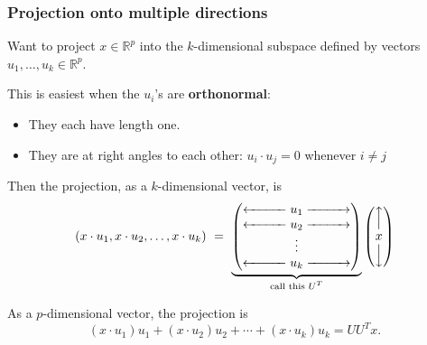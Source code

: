 \documentclass[smaller]{beamer}
\def\R{{\mathbb R}}
\def\darkred{\color{red!70!black}}
\def\darkgreen{\color{green!60!black}}
\def\vone{{\vskip.1in}}
\def\R{{\mathbb R}}
\begin{document}
\begin{frame}
\frametitle{Projection onto multiple directions}

{\darkred Want to project $x \in \R^p$ into the $k$-dimensional subspace defined by vectors $u_1, \ldots, u_k \in \R^p$.}

\pause\vone
This is easiest when the $u_i$'s are {\bf orthonormal}:
\begin{itemize}
\item They each have length one.
\item They are at right angles to each other: $u_i \cdot u_j = 0$ whenever $i \neq j$
\end{itemize}

\pause\vone
Then the projection, as a $k$-dimensional vector, is
$$ (x \cdot u_1, x \cdot u_2, \ldots, x \cdot u_k)
\ = \ 
\underbrace{\begin{pmatrix} 
\xleftarrow{\hspace*{1cm}} u_1 \xrightarrow{\hspace*{1cm}} \\
\xleftarrow{\hspace*{1cm}} u_2 \xrightarrow{\hspace*{1cm}} \\
 \vdots \\ 
\xleftarrow{\hspace*{1cm}} u_k \xrightarrow{\hspace*{1cm}} 
\end{pmatrix}}_{\text{call this $U^T$}} 
\begin{pmatrix}
\Big\uparrow \\
x \\
\Big\downarrow
\end{pmatrix}
$$

\pause\vone
{\darkgreen As a $p$-dimensional vector, the projection is
$$ (x \cdot u_1) u_1 + (x \cdot u_2) u_2 + \cdots + (x \cdot u_k)u_k = UU^T x.$$}
\end{frame}
\end{document}
